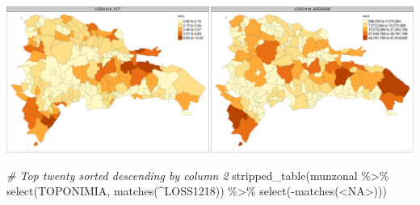 \documentclass[10pt,landscape,a3paper]{article}
\newenvironment{Shaded}{\begin{snugshade}}{\end{snugshade}}
\newcommand{\CommentTok}[1]{\textcolor[rgb]{0.56,0.35,0.01}{\textit{#1}}}
\newcommand{\FunctionTok}[1]{\textcolor[rgb]{0.00,0.00,0.00}{#1}}
\newcommand{\NormalTok}[1]{#1}
\newcommand{\SpecialCharTok}[1]{\textcolor[rgb]{0.00,0.00,0.00}{#1}}
\newcommand{\StringTok}[1]{\textcolor[rgb]{0.31,0.60,0.02}{#1}}
\begin{document}
\begin{center}\includegraphics{img/zonal-mun-5} \end{center}

\begin{Shaded}
\begin{Highlighting}[]
\CommentTok{\# Top twenty sorted descending by column 2}
\FunctionTok{stripped\_table}\NormalTok{(munzonal }\SpecialCharTok{\%\textgreater{}\%} \FunctionTok{select}\NormalTok{(TOPONIMIA, }\FunctionTok{matches}\NormalTok{(}\StringTok{\textquotesingle{}\^{}LOSS1218\textquotesingle{}}\NormalTok{)) }\SpecialCharTok{\%\textgreater{}\%} \FunctionTok{select}\NormalTok{(}\SpecialCharTok{{-}}\FunctionTok{matches}\NormalTok{(}\StringTok{\textquotesingle{}\textless{}NA\textgreater{}\textquotesingle{}}\NormalTok{)))}
\end{Highlighting}
\end{Shaded}
\end{document}

